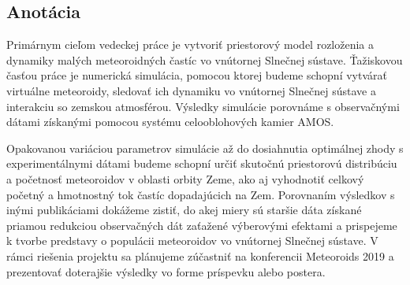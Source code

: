 \subsection{Anotácia}\label{anotuxe1cia}

Primárnym cieľom vedeckej práce je vytvoriť priestorový model rozloženia
a dynamiky malých meteoroidných častíc vo vnútornej Slnečnej sústave.
Ťažiskovou časťou práce je numerická simulácia, pomocou ktorej budeme
schopní vytvárať virtuálne meteoroidy, sledovať ich dynamiku vo
vnútornej Slnečnej sústave a interakciu so zemskou atmosférou. Výsledky
simulácie porovnáme s observačnými dátami získanými pomocou systému
celooblohových kamier AMOS.

Opakovanou variáciou parametrov simulácie až do dosiahnutia optimálnej
zhody s experimentálnymi dátami budeme schopní určiť skutočnú
priestorovú distribúciu a početnosť meteoroidov v oblasti orbity Zeme,
ako aj vyhodnotiť celkový početný a hmotnostný tok častíc dopadajúcich
na Zem. Porovnaním výsledkov s inými publikáciami dokážeme zistiť, do
akej miery sú staršie dáta získané priamou redukciou observačných dát
zaťažené výberovými efektami a prispejeme k tvorbe predstavy o populácii
meteoroidov vo vnútornej Slnečnej sústave. V rámci riešenia projektu sa
plánujeme zúčastniť na konferencii Meteoroids 2019 a prezentovať
doterajšie výsledky vo forme príspevku alebo postera.
